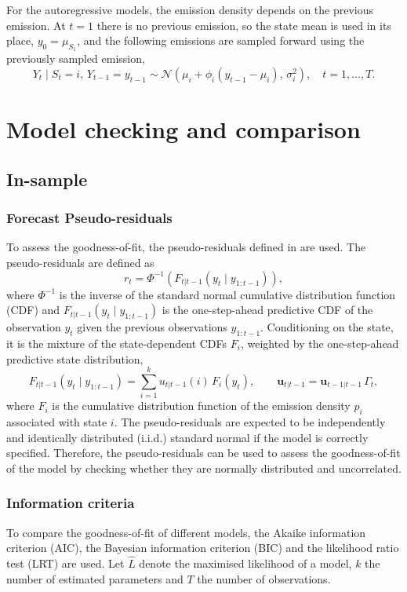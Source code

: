 For the autoregressive models, the emission density depends on the previous emission. At
$t = 1$ there is no previous emission, so the state mean is used in its place,
$y_0 = \mu_{S_1}$, and the following emissions are sampled forward using the previously
sampled emission,
\begin{equation}
    Y_t \mid S_t = i,\, Y_{t-1} = y_{t-1} \sim
    \mathcal{N}\!\left( \mu_i + \phi_i \left( y_{t-1} - \mu_i \right),\, \sigma_i^2 \right),
    \quad t = 1, \dots, T.
\end{equation}

\section{Model checking and comparison}
\subsection{In-sample}
\subsubsection{Forecast Pseudo-residuals}
To assess the goodness-of-fit, the pseudo-residuals
defined in \textcite[Sec.~7.3]{zucchini2016} are used. The pseudo-residuals are defined as
\begin{equation}
    r_t = \Phi^{-1}\left(F_{t|t-1}(y_t \mid y_{1:t-1})\right),
\end{equation}
where $\Phi^{-1}$ is the inverse of the standard normal cumulative distribution function (CDF)
and $F_{t|t-1}(y_t \mid y_{1:t-1})$ is the one-step-ahead predictive CDF of the observation $y_t$ given
the previous observations $y_{1:t-1}$. Conditioning on the state, it is the mixture of the
state-dependent CDFs $F_i$, weighted by the one-step-ahead predictive state distribution,
\begin{equation}
    F_{t|t-1}(y_t \mid y_{1:t-1}) = \sum_{i=1}^{k} u_{t|t-1}(i)\, F_i(y_t),
    \qquad \mathbf{u}_{t|t-1} = \mathbf{u}_{t-1|t-1}\, \Gamma_t,
\end{equation}
where $F_i$ is the cumulative distribution function of the emission density $p_i$ associated
with state $i$. The pseudo-residuals are expected to be
independently and identically distributed (i.i.d.) standard normal if the model is correctly specified. 
Therefore, the pseudo-residuals can be used to assess 
the goodness-of-fit of the model by checking 
whether they are normally distributed and uncorrelated. 

\subsubsection{Information criteria}
To compare the goodness-of-fit of different models,
the Akaike information criterion (AIC), 
the Bayesian information criterion (BIC) and the likelihood ratio test (LRT) are used.
Let $\hat{L}$ denote the maximised likelihood of a model, $k$ the number of
estimated parameters and $T$ the number of observations.

